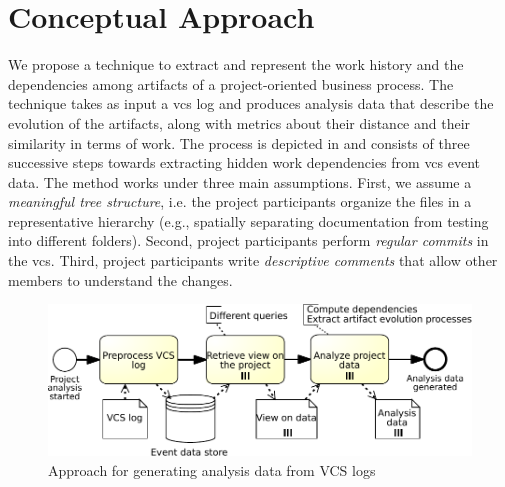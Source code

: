 \section{Conceptual Approach}
\label{sec:approach}



We propose a technique to extract and represent the work history and the dependencies among artifacts of a project-oriented business process. The technique takes as input a \gls{vcs} log and produces analysis data that describe the evolution of the artifacts, along with metrics about their distance and their similarity in terms of work.
The process is depicted in  and consists of three successive steps towards extracting hidden work dependencies from \gls{vcs} event data. The method works under three main assumptions. First, we assume a \emph{meaningful tree structure}, i.e. the project participants organize the files in a representative hierarchy (e.g., spatially separating documentation from testing into different folders). Second, project participants perform \emph{regular commits} in the \gls{vcs}. Third, project participants write \emph{descriptive comments} that allow other members to understand the changes.

\begin{figure}[h]
	\centering
	\includegraphics[width=.7\textwidth]{bpm2017/figures/visualization-process-crop}
	\caption[Approach for generating analysis data from VCS logs]{Approach for generating analysis data from VCS logs}
	\label{fig:visualization-process}
\end{figure}

